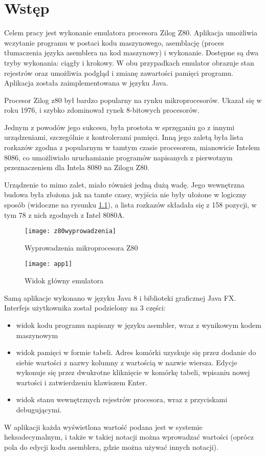 \chapter{Wstęp}

	Celem pracy jest wykonanie emulatora procesora Zilog Z80. Aplikacja umożliwia wczytanie programu w postaci kodu maszynowego, asemblację (proces tłumaczenia języka asemblera na kod maszynowy) i wykonanie. Dostępne są dwa tryby wykonania: ciągły i krokowy. W obu przypadkach emulator obrazuje stan rejestrów oraz umożliwia podgląd i zmianę zawartości pamięci programu. Aplikacja została zaimplementowana w języku Java.
	
	Procesor Zilog z80 był bardzo popularny na rynku mikroprocesorów\cite{karczmarczuk}. 
	Ukazał się w roku 1976, i szybko zdominował rynek 8-bitowych procesorów.
	
	Jednym z powodów jego sukcesu, była prostota w sprzęganiu go z innymi urządzeniami, szczególnie z kontrolerami pamięci. Inną jego zaletą była lista rozkazów zgodna z popularnym w tamtym czasie procesorem, mianowicie Intelem 8086, co umożliwiało uruchamianie programów napisanych z pierwotnym przeznaczeniem dla Intela 8080 na Zilogu Z80\cite{karczmarczuk}. 
	
	Urządzenie to mimo zalet, miało również jedną dużą wadę. Jego wewnętrzna budowa była złożona jak na tamte czasy, wyjścia nie były ułożone w logiczny sposób (widoczne na rysunku  \ref{img:z80wyprowadzenia}), a lista rozkazów składała się z 158 pozycji, w tym 78 z nich zgodnych z Intel 8080A\cite{manual}. 
	
	
	\begin{figure}[h]
		\centering
		\texttt{[image: z80wyprowadzenia]}
		\caption{Wyprowadzenia mikroprocesora Z80 \cite{karczmarczuk}}
		\label{img:z80wyprowadzenia}
	\end{figure}
			
	\begin{figure}[h]		
		\centering
		\texttt{[image: app1]}
		\caption{Widok główny emulatora}
	\end{figure}
	
	Samą aplikacje wykonano w języku Java 8 i biblioteki graficznej Java FX. 
	Interfejs użytkownika został podzielony na 3 części: 
	\begin{itemize}  
		\item widok kodu programu napisany w języku asembler, wraz z  wynikowym kodem maszynowym  
		\item widok pamięci w formie tabeli. Adres komórki uzyskuje się przez dodanie do siebie wartości z nazwy kolumny z wartością w nazwie wiersza. Edycje wykonuje się przez dwukrotne kliknięcie w komórkę tabeli, wpisaniu nowej wartości i zatwierdzeniu klawiszem Enter.
		\item widok stanu wewnętrznych rejestrów procesora, wraz z przyciskami debugującymi.   
	\end{itemize}
	
	W aplikacji każda wyświetlona wartość podana jest w systemie heksadecymalnym, i także w takiej notacji można wprowadzać wartości (oprócz pola do edycji kodu asemblera, gdzie można używać innych notacji).
	